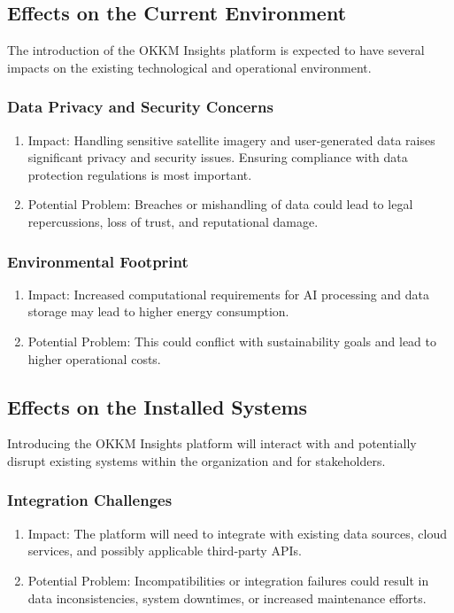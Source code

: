 \documentclass[12pt]{article}
\begin{document}
\subsection{Effects on the Current Environment}
The introduction of the OKKM Insights platform is expected to have several impacts on the existing technological and operational environment.
\subsubsection{Data Privacy and Security Concerns}
\begin{enumerate}
    \item Impact: Handling sensitive satellite imagery and user-generated data raises significant privacy and security issues. Ensuring compliance with data protection regulations is most important.
    \item Potential Problem: Breaches or mishandling of data could lead to legal repercussions, loss of trust, and reputational damage.
\end{enumerate}
\subsubsection{Environmental Footprint}
\begin{enumerate}
    \item Impact: Increased computational requirements for AI processing and data storage may lead to higher energy consumption.
    \item Potential Problem: This could conflict with sustainability goals and lead to higher operational costs.
\end{enumerate}
\subsection{Effects on the Installed Systems}
Introducing the OKKM Insights platform will interact with and potentially disrupt existing systems within the organization and for stakeholders.
\subsubsection{Integration Challenges}
\begin{enumerate}
    \item Impact: The platform will need to integrate with existing data sources, cloud services, and possibly applicable third-party APIs.
    \item Potential Problem: Incompatibilities or integration failures could result in data inconsistencies, system downtimes, or increased maintenance efforts.
\end{enumerate}
\end{document}
